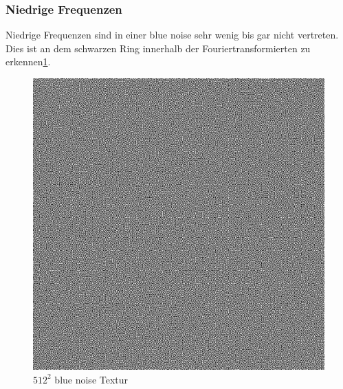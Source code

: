 \subsubsection{Niedrige Frequenzen}
Niedrige Frequenzen sind in einer blue noise sehr wenig bis gar nicht 
vertreten. Dies ist an dem schwarzen Ring innerhalb der Fouriertransformierten
zu erkennen\ref{pic:blueNoiseFFT}.

\begin{figure}[H]\label{pic:blueNoiseFFT}
    \centering
    \begin{minipage}[t]{0.45\linewidth}
        \centering
        \includegraphics[width=\linewidth]{content/BlueNoise/Bilder/LDR_LLL1_0.png}
        \caption{$512^{2}$ blue noise Textur}
    \end{minipage}
    \hfill
    \begin{minipage}[t]{0.45\linewidth}
        \centering

\end{minipage}
\end{figure}
